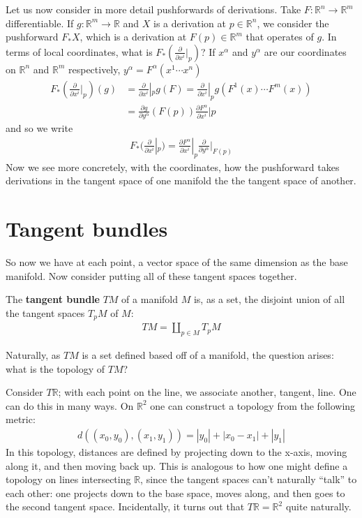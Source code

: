 \documentclass{../mathnotes}
\begin{document}
Let us now consider in more detail pushforwards of derivations. Take $F:\mathbb{R}^n\to\mathbb{R}^m$ differentiable. If $g:\mathbb{R}^m\to\mathbb{R}$
and $X$ is a derivation at $p\in\mathbb{R}^n$, we consider the pushforward $F_*X$, which is a derivation at $F(p)\in \mathbb{R}^m$ that operates of $g$.
In terms of local coordinates, what is $F_*(\frac{\partial}{\partial x^i}|_p)$? If $x^\alpha$ and $y^\alpha$ are our coordinates on $\mathbb{R}^n$ and $\mathbb{R}^m$
respectively, $y^\alpha=F^\alpha(x^1\cdots x^n)$
\begin{align*}
    F_*(\frac{\partial}{\partial x^i}|_p)(g)&=\frac{\partial}{\partial x^i}|_pg(F)=\frac{\partial}{\partial x^i}|_pg\left(F^1(x)\cdots F^m(x)\right)\\
    &=\frac{\partial g}{\partial y^\alpha}\left( F(p) \right)\frac{\partial F^\alpha}{\partial x^i}|p
\end{align*}
and so we write
\begin{align*}
    F_*(\frac{\partial}{\partial x^i}|_p)=\frac{\partial F^\alpha}{\partial x^i}|_p\frac{\partial }{\partial y^\alpha}|_{F(p)}
\end{align*}
Now we see more concretely, with the coordinates, how the pushforward takes derivations in the tangent space of one manifold the the tangent space of another.

\section{Tangent bundles}

So now we have at each point, a vector space of the same dimension as the base manifold. Now consider putting all of these tangent spaces together.

\begin{defn}
    The \textbf{tangent bundle} $TM$ of a manifold $M$ is, as a set, the disjoint union of all the tangent spaces $T_pM$ of $M$:
    \begin{align*}
        TM=\coprod_{p\in M}T_pM
    \end{align*}
\end{defn}

Naturally, as $TM$ is a set defined based off of a manifold, the question arises: what is the topology of $TM$?

Consider $T\mathbb{R}$; with each point on the line, we associate another,
tangent, line. One can do this in many ways. On $\mathbb{R}^2$ one can construct a topology from the following metric:
\begin{align*}
    d\left( (x_0,y_0),(x_1,y_1) \right)=|y_0|+|x_0-x_1|+|y_1|
\end{align*}
In this topology, distances are defined by projecting down to the x-axis, moving along it, and then moving back up. This is analogous to how one might
define a topology on lines intersecting $\mathbb{R}$, since the tangent spaces can't naturally ``talk'' to each other: one projects down to the base space,
moves along, and then goes to the second tangent space. Incidentally, it turns out that $T\mathbb{R}=\mathbb{R}^2$ quite naturally.
\end{document}
